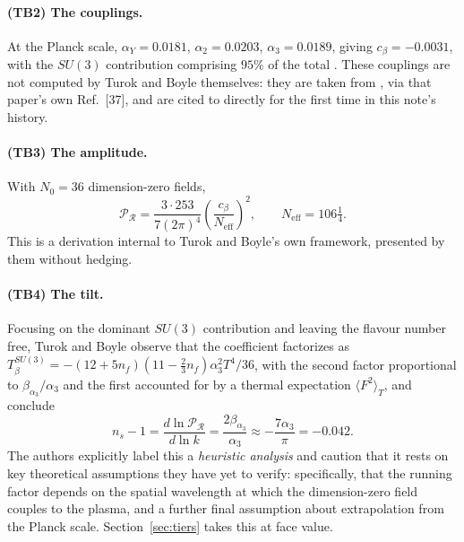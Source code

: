 \documentclass[11pt]{article}
\theoremstyle{definition}
\theoremstyle{remark}
\begin{document}
\paragraph{(TB2) The couplings.} At the Planck scale, $\alpha_Y = 0.0181$, $\alpha_2 = 0.0203$,
$\alpha_3 = 0.0189$, giving $c_\beta = -0.0031$, with the $SU(3)$ contribution comprising $95\%$ of
the total \citep{TurokBoyle2023}. These couplings are not computed by Turok and Boyle themselves:
they are taken from \citet{Buttazzo2013}, via that paper's own Ref.~[37], and are cited to
\citet{Buttazzo2013} directly for the first time in this note's history.

\paragraph{(TB3) The amplitude.} With $N_0 = 36$ dimension-zero fields,
\begin{equation}
\mathcal{P}_\mathcal{R} = \frac{3\cdot 253}{7(2\pi)^4}\left(\frac{c_\beta}{N_{\mathrm{eff}}}\right)^2,
\qquad N_{\mathrm{eff}} = 106\tfrac{1}{4}.
\label{eq:amplitude}
\end{equation}
This is a derivation internal to Turok and Boyle's own framework, presented by them without
hedging.

\paragraph{(TB4) The tilt.} Focusing on the dominant $SU(3)$ contribution and leaving the flavour
number free, Turok and Boyle observe that the coefficient factorizes as
$T_\beta^{SU(3)} = -(12+5n_f)(11-\tfrac23 n_f)\alpha_3^2 T^4/36$, with the second factor
proportional to $\beta_{\alpha_3}/\alpha_3$ and the first accounted for by a thermal expectation
$\langle F^2\rangle_T$, and conclude
\begin{equation}
n_s - 1 = \frac{d\ln \mathcal{P}_\mathcal{R}}{d\ln k} = \frac{2\beta_{\alpha_3}}{\alpha_3} \approx
-\frac{7\alpha_3}{\pi} = -0.042.
\label{eq:tilt}
\end{equation}
The authors explicitly label this a \emph{heuristic analysis} and caution that it rests on key
theoretical assumptions they have yet to verify: specifically, that the running factor depends on
the spatial wavelength at which the dimension-zero field couples to the plasma, and a further final
assumption about extrapolation from the Planck scale. Section~\ref{sec:tiers} takes this at face
value.
\end{document}
